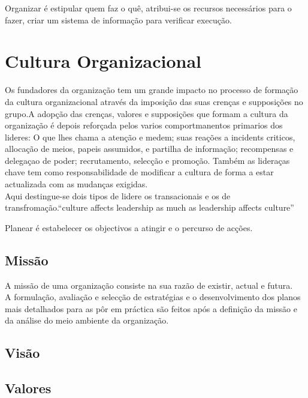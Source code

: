 Organizar é estipular quem faz o quê, atribui-se os recursos necessários para o fazer, criar um sistema de informação para verificar execução.\\



\section{Cultura Organizacional}
Os fundadores da organização tem um grande impacto no processo de formação da cultura organizacional através da imposição das suas crenças e supposições no grupo.A adopção das crenças, valores e supposições que formam a cultura da organização é depois reforçada pelos varios comportmanentos primarios dos lideres: O que lhes chama a atenção e medem; suas reações a incidents criticos, allocação de meios, papeis assumidos, e partilha de informação; recompensas e delegaçao de poder; recrutamento, selecção e promoção. Também as lideraças chave tem como responsabilidade de modificar a cultura de forma a estar actualizada com as mudanças exigidas.\\

Aqui destingue-se dois tipos de lidere os transacionais e os de transfromação.“culture affects leadership as much as leadership affects culture”

Planear é estabelecer os objectivos a atingir e o percurso de acções.\\

\subsection{Missão}
A missão de uma organização consiste na sua razão de existir, actual e futura.\\
A formulação, avaliação e selecção de estratégias e o desenvolvimento dos planos mais detalhados para as pôr em práctica são feitos após a definição da missão e da análise do meio ambiente da organização.\\



\subsection{Visão}



\subsection{Valores}



